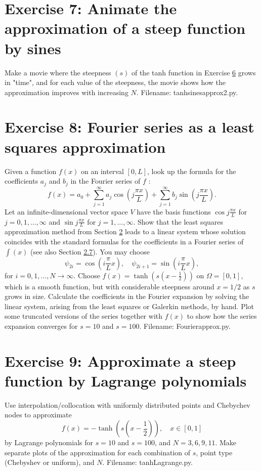 \documentclass[../main.tex]{subfiles}
\begin{document}
\section*{Exercise 7: Animate the approximation of a steep function by sines}
\label{sec:sec_10_7}
\noindent Make a movie where the steepness $(s)$ of the tanh function in Exercise \hyperref[sec:sec_10_6]{6} grows in "time", and for each value of the steepness, the movie shows how the approximation improves with increasing $N$. Filename: tanh\textunderscore sines\textunderscore approx2.py.
\bigbreak
\section*{Exercise 8: Fourier series as a least squares approximation}
\label{sec:sec_10_8}
\noindent Given a function $f(x)$ on an interval $[0, L]$, look up the formula for the coefficients $a_{j}$ and $b_{j}$ in the Fourier series of $f$ :
$$
f(x)=a_{0}+\sum_{j=1}^{\infty} a_{j} \cos \left(j \frac{\pi x}{L}\right)+\sum_{j=1}^{\infty} b_{j} \sin \left(j \frac{\pi x}{L}\right).
$$
Let an infinite-dimensional vector space $V$ have the basis functions $\cos j \frac{\pi x}{L}$ for $j=0,1, \ldots, \infty$ and $\sin j \frac{\pi x}{L}$ for $j=1, \ldots, \infty$. Show that the least squares approximation method from Section \hyperref[chap:chap_2]{2} leads to a linear system whose solution coincides with the standard formulas for the coefficients in a Fourier series of $\int(x)$ (see also Section \hyperref[sec:sec_2_7]{2.7}). You may choose
$$
\psi_{2 i}=\cos \left(i \frac{\pi}{L} x\right), \quad \psi_{2 i+1}=\sin \left(i \frac{\pi}{L} x\right),
$$
for $i=0,1, \ldots, N \rightarrow \infty$.
Choose $f(x)=\tanh \left(s\left(x-\frac{1}{2}\right)\right)$ on $\Omega=[0,1]$, which is a smooth function, but with considerable steepness around $x=1 / 2$ as $s$ grows in size. Calculate the coefficients in the Fourier expansion by solving the linear system, arising from the least squares or Galerkin methods, by hand. Plot some truncated versions of the series together with $f(x)$ to show how the series expansion converges for $s=10$ and $s=100$. Filename: Fourier\textunderscore approx.py.
\bigbreak
\section*{Exercise 9: Approximate a steep function by Lagrange polynomials}
\label{sec:sec_10_9}
\noindent Use interpolation/collocation with uniformly distributed points and Chebychev nodes to approximate
$$
f(x)=-\tanh \left(s\left(x-\frac{1}{2}\right)\right), \quad x \in[0,1]
$$
by Lagrange polynomials for $s=10$ and $s=100$, and $N=3,6,9,11$. Make separate plots of the approximation for each combination of $s$, point type (Chebyshev or uniform), and $N$. Filename: tanh\textunderscore Lagrange.py.
\bigbreak
\end{document}
